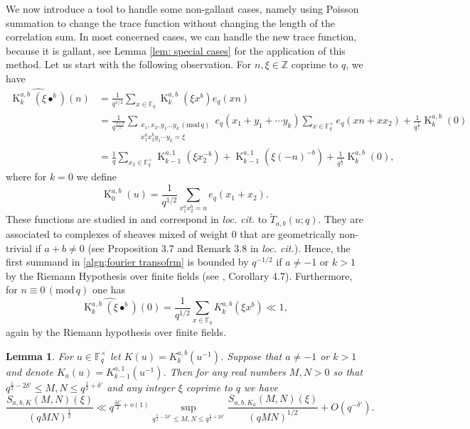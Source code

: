 \documentclass[12pt]{amsart}
\theoremstyle{plain}
\newtheorem{lem}[thm]{Lemma}
\theoremstyle{definition}
\theoremstyle{remark}
\numberwithin{equation}{section}
\newcommand{\ZZ}{\mathbb{Z}}
\newcommand{\FF}{\mathbb{F}}
\newcommand{\mods}[1]{\,(\mathrm{mod}\,{#1})}
\renewcommand{\leq}{\leqslant}
\DeclareMathOperator{\K}{K} %
\begin{document}
We now introduce a tool to handle some non-gallant cases, namely using Poisson summation to change the trace function without changing the length of the correlation sum. In most concerned cases, we can handle the new trace function, because it is gallant, see Lemma \ref{lem: special cases} for the application of this method. 
Let us start with the following observation. For $n,\xi\in \ZZ$ coprime to $q$, we have \begin{align}\label{algn;fourier transofrm}
            \widehat{\K_{k}^{a,b}(  \xi\bullet^b)}(n) &=\frac{1}{q^{1/2}}\sum_{x\in \FF_q} \K^{a,b}_{k}(  \xi x^b)e_q(xn)\nonumber\\
            &= \frac{1}{q^{\frac{k+2}{2}}}\sum_{\substack{x_1,x_2,y_1\ldots y_k \mods q\\x_1^ax_2^by_1\cdots y_k =   \xi}}e_q(x_1+y_1+\cdots y_k)\sum_{x \in \FF_q^{\times}}e_q(xn+xx_2) +\frac{1}{q^{\frac{1}{2}}}\K_k^{a,b}(0)\nonumber\\ 
            & = \frac{1}{q }\sum_{x_2 \in \FF_q^{\times}} \K^{a,1}_{k-1}(  \xi x_2^{-b})+\K^{a,1}_{k-1}( \xi (-n)^{-b})+\frac{1}{q^{\frac{1}{2}}}\K_k^{a,b}(0),
        \end{align}
where for $k=0$ we define \begin{equation}\label{eq: defi K_k^a,b for k=0}
\K_0^{a,b}(u) = \frac{1}{q^{1/2}}\sum_{x_1^ax_2^b=u}e_q(x_1+x_2).\end{equation} These functions are studied in \cite{FKMsecondmom} and correspond in \emph{loc. cit.} to $\widetilde{T}_{a,b}(u;q)$. They are associated to complexes of sheaves mixed of weight $0$ that are geometrically non-trivial if $a+b \neq 0$ (see Proposition 3.7 and Remark 3.8 in \emph{loc. cit.}). Hence, the first summand in \eqref{algn;fourier transofrm} is bounded by $q^{-1/2}$ if $a\neq -1$ or $k>1$ by the Riemann Hypothesis over finite fields (see \cite{AppliedladicCohom}, Corollary 4.7). 
Furthermore, for $n\equiv 0 \mods{q}$ one has 
\[ \widehat{\K_k^{a,b}(\xi \bullet^b)}(0 ) = \frac{1}{q^{1/2}}\sum_{x\in \FF_q}K_k^{a,b}(\xi x^b) \ll 1,\] 
again by the Riemann hypothesis over finite fields.



\begin{lem} \label{l:poissontrick} For $u\in \FF_q^{\times}$ let $K(u) = K_k^{a,b}(u^{-1})$.
Suppose that $a\neq -1$  or $k>1$ and denote $K_a(u) =  K_{k-1}^{a,1}(u^{-1})$.
    Then for any real numbers $M,N>0$ so that $q^{\frac{1}{2}-2\delta'}\leq M,N\leq q^{\frac{1}{2}+\delta'}$ and any integer $\xi$ coprime to $q$ we have 
    \[\frac{S_{a,b,K}(M,N)(\xi)}{(qMN)^{\frac{1}{2}}}\ll q^{\frac{3\delta'}{2}+o(1)}\sup_{q^{\frac{1}{2}-2\delta'}\leq M,N\leq q^{\frac{1}{2}+2\delta'}}\frac{S_{a,b,K_a}(M,N)(\xi)}{(qMN)^{1/2}} + O(q^{-\delta'}). \]
\end{lem}
\end{document}
